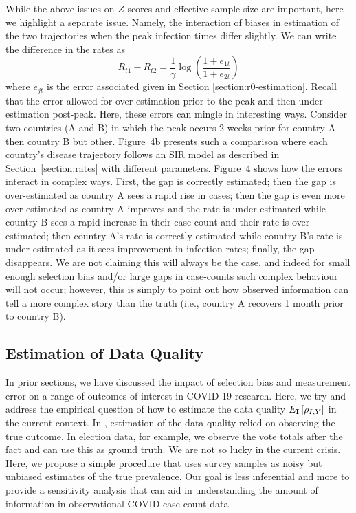 \documentclass[12pt]{article}
\def\I{{\bf I}}
\begin{document}
While the above issues on $Z$-scores and effective sample size are important, here we highlight a separate issue.  Namely, the interaction of biases in estimation of the two trajectories when the peak infection times differ slightly.  We can write the difference in the rates as
$$
R_{t1} - R_{t2} = \frac{1}{\gamma} \log \left( \frac{1 + e_{1t}}{1+e_{2t}} \right)
$$
where $e_{jt}$ is the error associated given in Section \ref{section:r0-estimation}.  Recall that the error allowed for over-estimation prior to the peak and then under-estimation post-peak.  Here, these errors can mingle in interesting ways.  Consider two countries (A and B) in which the peak occurs 2 weeks prior for country A then country B but other.  Figure~4b presents such a comparison where each country's disease trajectory follows an SIR model as described in Section~\ref{section:rates} with different parameters.  Figure~4 shows how the errors interact in complex ways.  First, the gap is correctly estimated; then the gap is over-estimated as country A sees a rapid rise in cases; then the gap is even more over-estimated as country A improves and the rate is under-estimated while country B sees a rapid increase in their case-count and their rate is over-estimated; then country A's rate is correctly estimated while country B's rate is under-estimated as it sees improvement in infection rates; finally, the gap disappears.  We are not claiming this will always be the case, and indeed for small enough selection bias and/or large gaps in case-counts such complex behaviour will not occur; however, this is simply to point out how observed information can tell a more complex story than the truth (i.e., country A recovers 1 month prior to country B).

\subsection*{Estimation of Data Quality}
\label{section:est_dq}

In prior sections, we have discussed the impact of selection bias and measurement error on a range of outcomes of interest in COVID-19 research.  Here, we try and address the empirical question of how to estimate the data quality $E_{\I} \left[ \rho_{I,Y} \right]$ in the current context.
In \cite{Meng2018}, estimation of the data quality relied on observing the true outcome.  In election data, for example, we observe the vote totals after the fact and can use this as ground truth.  We are not so lucky in the current crisis.  Here, we propose a simple procedure that uses survey samples as noisy but unbiased estimates of the true prevalence. Our goal is less inferential and more to provide a sensitivity analysis that can aid in understanding the amount of information in observational COVID case-count data.
\end{document}

